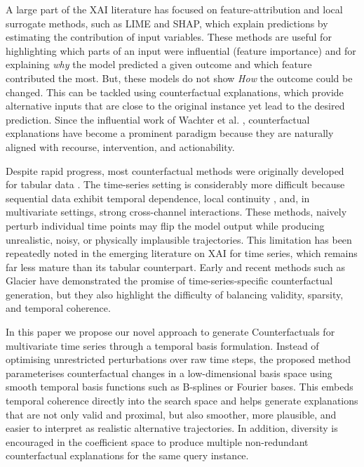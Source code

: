 \documentclass[runningheads]{llncs}
\begin{document}
	A large part of the XAI literature has focused on feature-attribution and local surrogate methods\cite{XAI_Core_Sol_ACM_10.1145/3561048}, such as LIME\cite{LIME_10.1145/2939672.2939778} and SHAP\cite{SHAP_10.5555/3295222.3295230}, which explain predictions by estimating the contribution of input variables. These methods are useful for highlighting which parts of an input were influential (feature importance) and for explaining \textit{why} the model predicted a given outcome and which feature contributed the most. But, these models do not show \textit{How} the outcome could be changed. This can be tackled using counterfactual explanations, which provide alternative inputs that are close to the original instance yet lead to the desired prediction. Since the influential work of Wachter et al. \cite{wachter2017counterfactual}, counterfactual explanations have become a prominent paradigm because they are naturally aligned with recourse, intervention, and actionability.
	
	Despite rapid progress, most counterfactual methods were originally developed for tabular data \cite{CF_LIT_Rev_10.1007/s10618-022-00831-6}. The time-series setting is considerably more difficult because sequential data exhibit temporal dependence, local continuity \cite{Learn_CF_Intervals_10.1145/3627673.3679952}, and, in multivariate settings, strong cross-channel interactions. These methods, naively perturb individual time points may flip the model output while producing unrealistic, noisy, or physically implausible trajectories. This limitation has been repeatedly noted in the emerging literature on XAI for time series, which remains far less mature than its tabular counterpart. Early and recent methods such as Glacier \cite{Wang2024} have demonstrated the promise of time-series-specific counterfactual generation, but they also highlight the difficulty of balancing validity, sparsity, and temporal coherence.
	
	In this paper we propose our novel approach to generate Counterfactuals for multivariate time series through a temporal basis formulation. Instead of optimising unrestricted perturbations over raw time steps, the proposed method parameterises counterfactual changes in a low-dimensional basis space using smooth temporal basis functions such as B-splines or Fourier bases. This embeds temporal coherence directly into the search space and helps generate explanations that are not only valid and proximal, but also smoother, more plausible, and easier to interpret as realistic alternative trajectories. In addition, diversity is encouraged in the coefficient space to produce multiple non-redundant counterfactual explanations for the same query instance.
	
\end{document}
